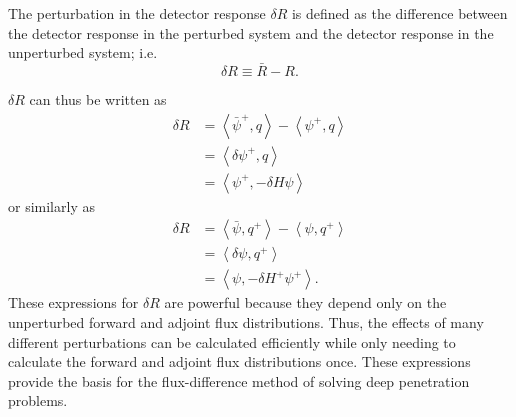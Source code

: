 The perturbation in the detector response $\delta R$ is defined as the difference between the detector response in the perturbed system and the detector response in the unperturbed system; i.e.
\begin{equation}\label{eq:bg:pt:delta_r}
  \delta R \equiv \bar{R} - R.
\end{equation}

$\delta R$ can thus be written as
\begin{equation}\label{eq:bg:pt:green170a}\begin{split}
  \delta R & = \left<\bar{\psi}^+,q\right> - \left<\psi^+,q\right> \\
           & = \left<\delta\psi^+,q\right> \\
           & = \left<\psi^+,-\delta H\psi\right>
\end{split}\end{equation}
or similarly as
\begin{equation}\label{eq:bg:pt:green170b}\begin{split}
  \delta R & = \left<\bar{\psi},q^+\right> - \left<\psi,q^+\right> \\
           & = \left<\delta\psi,q^+\right> \\
           & = \left<\psi,-\delta H^+\psi^+\right>.
\end{split}\end{equation}
These expressions for $\delta R$ are powerful because they depend only on the unperturbed forward and adjoint flux distributions.
Thus, the effects of many different perturbations can be calculated efficiently while only needing to calculate the forward and adjoint flux distributions once.
These expressions provide the basis for the flux-difference method of solving deep penetration problems.
